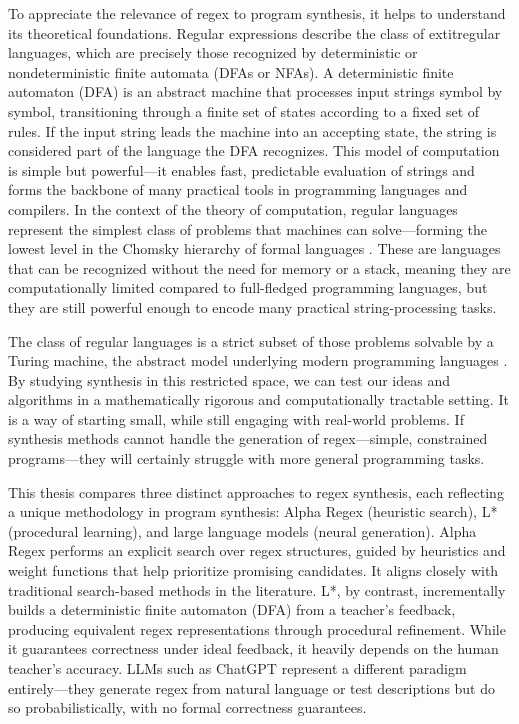 \indent\indent To appreciate the relevance of regex to program synthesis, it helps to understand its theoretical foundations. Regular expressions describe the class of 	extit{regular languages}, which are precisely those recognized by deterministic or nondeterministic finite automata (DFAs or NFAs). A deterministic finite automaton (DFA) is an abstract machine that processes input strings symbol by symbol, transitioning through a finite set of states according to a fixed set of rules. If the input string leads the machine into an accepting state, the string is considered part of the language the DFA recognizes. This model of computation is simple but powerful—it enables fast, predictable evaluation of strings and forms the backbone of many practical tools in programming languages and compilers. In the context of the theory of computation, regular languages represent the simplest class of problems that machines can solve—forming the lowest level in the Chomsky hierarchy of formal languages \cite{chomsky_1956_three}. These are languages that can be recognized without the need for memory or a stack, meaning they are computationally limited compared to full-fledged programming languages, but they are still powerful enough to encode many practical string-processing tasks.

\indent\indent  The class of regular languages is a strict subset of those problems solvable by a Turing machine, the abstract model underlying modern programming languages \cite{sipser_1996_introduction}. By studying synthesis in this restricted space, we can test our ideas and algorithms in a mathematically rigorous and computationally tractable setting. It is a way of starting small, while still engaging with real-world problems. If synthesis methods cannot handle the generation of regex—simple, constrained programs—they will certainly struggle with more general programming tasks.

\indent\indent This thesis compares three distinct approaches to regex synthesis, each reflecting a unique methodology in program synthesis: Alpha Regex (heuristic search), L* (procedural learning), and large language models (neural generation). Alpha Regex performs an explicit search over regex structures, guided by heuristics and weight functions that help prioritize promising candidates. It aligns closely with traditional search-based methods in the literature. L*, by contrast, incrementally builds a deterministic finite automaton (DFA) from a teacher's feedback, producing equivalent regex representations through procedural refinement. While it guarantees correctness under ideal feedback, it heavily depends on the human teacher's accuracy. LLMs such as ChatGPT represent a different paradigm entirely—they generate regex from natural language or test descriptions but do so probabilistically, with no formal correctness guarantees.

